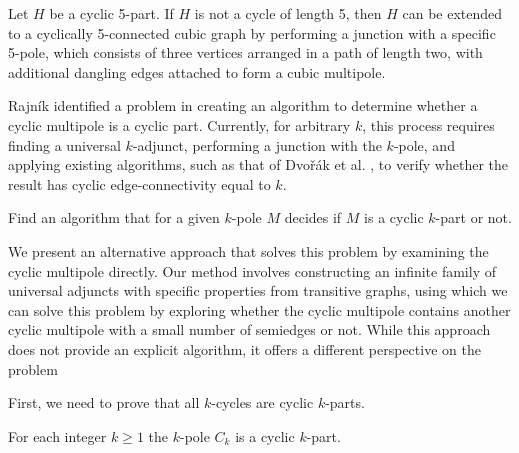 \documentclass[12pt, twoside]{book}
\begin{document}
\begin{theorem}
	Let $H$ be a cyclic 5-part. If $H$ is not a cycle of length 5, then $H$ can be extended to a cyclically 5-connected cubic graph by performing a junction with a specific 5-pole, which consists of three vertices arranged in a path of length two, with additional dangling edges attached to form a cubic multipole.
\end{theorem}

Rajník \cite{Rajnik_phd} identified a problem in creating an algorithm to determine whether a cyclic multipole is a cyclic part. Currently, for arbitrary $k$, this process requires finding a universal $k$-adjunct, performing a junction with the $k$-pole, and applying existing algorithms, such as that of Dvořák et al. \cite{Dvorak2004}, to verify whether the result has cyclic edge-connectivity equal to $k$.

\begin{problem}
	Find an algorithm that for a given $k$-pole $M$ decides if $M$ is a cyclic $k$-part or not.
\end{problem}

We present an alternative approach that solves this problem by examining the cyclic multipole directly. Our method involves constructing an infinite family of universal adjuncts with specific properties from transitive graphs, using which we can solve this problem by exploring whether the cyclic multipole contains another cyclic multipole with a small number of semiedges or not. While this approach does not provide an explicit algorithm, it offers a different perspective on the problem

First, we need to prove that all $k$-cycles are cyclic $k$-parts.

\begin{lemma}\label{lem:each-cycle-cyclic-part}
	For each integer $k\geq 1$ the $k$-pole $C_k$ is a cyclic $k$-part. 
\end{lemma}
\end{document}
